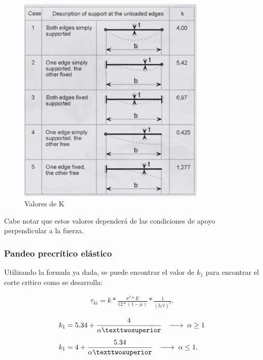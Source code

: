 \documentclass[../main.tex]{subfiles}
\begin{document}
\begin{figure}[htpb]
  \centering
  \includegraphics[width=0.8\textwidth]{../images/20210517/valork}
  \caption{Valores de K}
  \label{fig:valork}
\end{figure}

Cabe notar que estos valores dependerá de las condiciones de apoyo perpendicular
a la fuerza.

\subsubsection{Pandeo precrítico elástico}

Utilizando la formula ya dada, se puede encontrar el valor de $k_1$ para encontrar
el corte critico como se desarrolla:

\begin{align*}
  \tau_{ki} = k * \frac{\pi^{2}*E}{12*(1-\mu)}*\frac{1}{(b / t)^{2}}
.\end{align*}


\begin{align*}
  k_1 &= 5.34 + \frac{4}{\alpha²} \hspace{0.25cm} \xrightarrow{\hspace*{0.5cm}} \hspace{0.1cm} \alpha \geq 1  \\[5pt]
  k_1 &= 4 + \frac{5.34}{\alpha²} \hspace{0.25cm} \xrightarrow{\hspace*{0.5cm}} \hspace{0.1cm} \alpha \leq 1 
.\end{align*}
\end{document}
